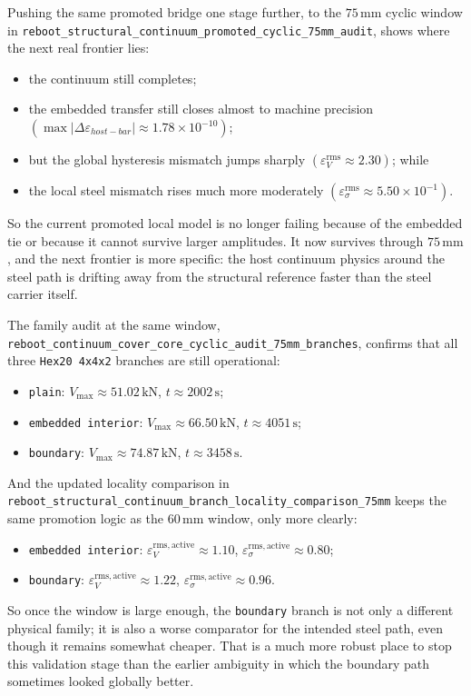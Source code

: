 Pushing the same promoted bridge one stage further, to the
\(75\,\mathrm{mm}\) cyclic window in
\texttt{reboot\_structural\_continuum\_promoted\_cyclic\_75mm\_audit}, shows
where the next real frontier lies:
\begin{itemize}
  \item the continuum still completes;
  \item the embedded transfer still closes almost to machine precision
    \((\max |\Delta \varepsilon_{host-bar}| \approx 1.78\times10^{-10})\);
  \item but the global hysteresis mismatch jumps sharply
    \((\varepsilon_V^{\mathrm{rms}} \approx 2.30)\); while
  \item the local steel mismatch rises much more moderately
    \((\varepsilon_\sigma^{\mathrm{rms}} \approx 5.50\times10^{-1})\).
\end{itemize}
So the current promoted local model is no longer failing because of the
embedded tie or because it cannot survive larger amplitudes. It now survives
through \(75\,\mathrm{mm}\), and the next frontier is more specific: the host
continuum physics around the steel path is drifting away from the structural
reference faster than the steel carrier itself.

The family audit at the same window,
\texttt{reboot\_continuum\_cover\_core\_cyclic\_audit\_75mm\_branches}, confirms
that all three \texttt{Hex20 4x4x2} branches are still operational:
\begin{itemize}
  \item \texttt{plain}: \(V_{\max} \approx 51.02\,\mathrm{kN}\),
    \(t \approx 2002\,\mathrm{s}\);
  \item \texttt{embedded interior}: \(V_{\max} \approx 66.50\,\mathrm{kN}\),
    \(t \approx 4051\,\mathrm{s}\);
  \item \texttt{boundary}: \(V_{\max} \approx 74.87\,\mathrm{kN}\),
    \(t \approx 3458\,\mathrm{s}\).
\end{itemize}
And the updated locality comparison in
\texttt{reboot\_structural\_continuum\_branch\_locality\_comparison\_75mm}
keeps the same promotion logic as the \(60\,\mathrm{mm}\) window, only more
clearly:
\begin{itemize}
  \item \texttt{embedded interior}:
    \(\varepsilon_V^{\mathrm{rms,active}} \approx 1.10\),
    \(\varepsilon_\sigma^{\mathrm{rms,active}} \approx 0.80\);
  \item \texttt{boundary}:
    \(\varepsilon_V^{\mathrm{rms,active}} \approx 1.22\),
    \(\varepsilon_\sigma^{\mathrm{rms,active}} \approx 0.96\).
\end{itemize}
So once the window is large enough, the \texttt{boundary} branch is not only a
different physical family; it is also a worse comparator for the intended
steel path, even though it remains somewhat cheaper. That is a much more robust
place to stop this validation stage than the earlier ambiguity in which the
boundary path sometimes looked globally better.

